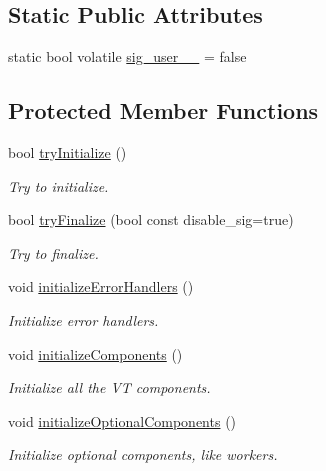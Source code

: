 \subsection*{Static Public Attributes}
\begin{DoxyCompactItemize}
\item 
static bool volatile \hyperlink{structvt_1_1runtime_1_1_runtime_ac0373f2326b45f348e2db166d328e2d6}{sig\+\_\+user\+\_\+\_\+} = false
\end{DoxyCompactItemize}
\subsection*{Protected Member Functions}
\begin{DoxyCompactItemize}
\item 
bool \hyperlink{structvt_1_1runtime_1_1_runtime_a651174e20fa3db2493bd4c0cf2e8be3c}{try\+Initialize} ()
\begin{DoxyCompactList}\small\item\em Try to initialize. \end{DoxyCompactList}\item 
bool \hyperlink{structvt_1_1runtime_1_1_runtime_a10f74f2fa128ce1f7aa3d69395c64f8c}{try\+Finalize} (bool const disable\+\_\+sig=true)
\begin{DoxyCompactList}\small\item\em Try to finalize. \end{DoxyCompactList}\item 
void \hyperlink{structvt_1_1runtime_1_1_runtime_adf6407cff70ac8c332d75911a81b508d}{initialize\+Error\+Handlers} ()
\begin{DoxyCompactList}\small\item\em Initialize error handlers. \end{DoxyCompactList}\item 
void \hyperlink{structvt_1_1runtime_1_1_runtime_a798be8c8813889ef0aacdbc8668d8a41}{initialize\+Components} ()
\begin{DoxyCompactList}\small\item\em Initialize all the VT components. \end{DoxyCompactList}\item 
void \hyperlink{structvt_1_1runtime_1_1_runtime_a61abc4a1b440263bd129ee0950a05e69}{initialize\+Optional\+Components} ()
\begin{DoxyCompactList}\small\item\em Initialize optional components, like workers. \end{DoxyCompactList}\item 

\end{DoxyCompactItemize}
